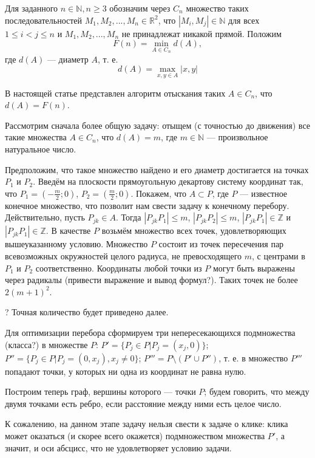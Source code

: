 \documentclass{article}
\begin{document}
Для заданного $n\in \mathbb{N}, n\geq 3$ обозначим через $C_n$ множество таких последовательностей $M_1,M_2,...,M_n \in \mathbb{R}^2$, что $|M_i,M_j|\in\mathbb{N}$ для всех $1\leq i < j  \leq n$ и  $M_1,M_2,...,M_n$ не принадлежат никакой прямой.
Положим
$$
F(n)=\min\limits_{A\in C_n} d(A),
$$
где $d(A)$ --- диаметр $A$, т. е.
$$
d(A)=\max\limits_{x,y\in A}|x,y|
$$

В настоящей статье представлен алгоритм отыскания таких $A \in C_n$, что $d(A) = F(n)$.






Рассмотрим сначала более общую задачу: отыщем (с точностью до движения) все такие множества $A \in C_n$, что $d(A) = m$, где $m \in \mathbb{N}$ --- произвольное натуральное число.

Предположим, что такое множество найдено и его диаметр достигается на точках $P_1$ и $P_2$.
Введём на плоскости прямоугольную декартову систему координат так, что $P_1 = (-\frac{m}{2}; 0)$, $P_2 = (\frac{m}{2}; 0)$.
Покажем, что $A \subset P$, где $P$ --- известное конечное множество, что позволит нам свести задачу к конечному перебору.
Действительно, пусть $P_{jk} \in A$.
Тогда $|P_{jk} P_1| \leq m$, $|P_{jk} P_2| \leq m$, $|P_{jk} P_1| \in \mathbb{Z}$ и $|P_{jk} P_1| \in \mathbb{Z}$.
В качестве $P$ возьмём множество всех точек, удовлетворяющих вышеуказанному условию.
Множество $P$ состоит из точек пересечения пар всевозможных окружностей целого радиуса, не превосходящего $m$, с центрами в $P_1$ и $P_2$ соответственно.
Координаты любой точки из $P$ могут быть выражены через радикалы (привести выражение и вывод формул?).
Таких точек не более $2(m+1)^2$.

? Точная количество будет приведено далее.

Для оптимизации перебора сформируем три непересекающихся подмножества (класса?) в множестве $P$:
$P' = \{P_j \in P | P_j = (x_j, 0)\}$;
$P'' = \{P_j \in P | P_j = (0, x_j), x_j \neq 0\}$;
$P''' = P \setminus \left( P' \cup P ''\right)$,
т. е. в множество $P'''$ попадают точки, у которых ни одна из координат не равна нулю.

Построим теперь граф, вершины которого --- точки $P$;
будем говорить, что между двумя точками есть ребро, если расстояние между ними есть целое число.

К сожалению, на данном этапе задачу нельзя свести к задаче о клике:
клика может оказаться (и скорее всего окажется) подмножеством множества $P'$, а значит, и оси абсцисс, что не удовлетворяет условию задачи.
\end{document}
